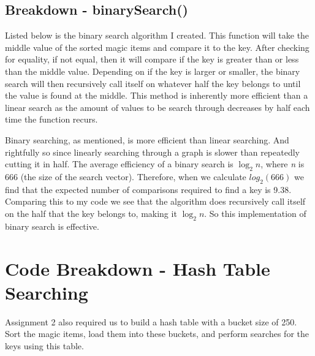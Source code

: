\documentclass[12pt, letterpaper]{article}
\begin{document}
\subsection{Breakdown - binarySearch()} \label{BinSchCde}
Listed below is the binary search algorithm I created. 
This function will take the middle value of the sorted magic items and compare it to the key.
After checking for equality, if not equal, then it will compare if the key is greater than or less than the middle value.
Depending on if the key is larger or smaller, the binary search will then recursively call itself on whatever half the key belongs to until the value is found at the middle.
\newline
\indent This method is inherently more efficient than a linear search as the amount of values to be search through decreases by half each time the function recurs. 

Binary searching, as mentioned, is more efficient than linear searching.
And rightfully so since linearly searching through a graph is slower than repeatedly cutting it in half.
The average efficiency of a binary search is $\log_2 n$, where \textit{n} is 666 (the size of the search vector).
\newline
\indent Therefore, when we calculate $log_2 (666)$ we find that the expected number of comparisons required to find a key is 9.38.
Comparing this to my code we see that the algorithm does recursively call itself on the half that the key belongs to, making it $\log_2 n$.
So this implementation of binary search is effective.

\section{Code Breakdown - Hash Table Searching}
Assignment 2 also required us to build a hash table with a bucket size of 250. 
Sort the magic items, load them into these buckets, and perform searches for the keys using this table.
\end{document}
